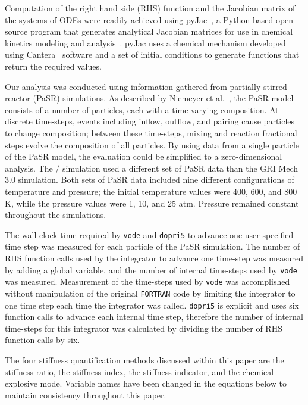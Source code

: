 \documentclass[12pt]{ussci}
\begin{document}
Computation of the right hand side (RHS) function and the Jacobian matrix of the systems of ODEs were readily achieved using pyJac~\cite{pyJac:1.0.2}, a Python-based open-source program that generates analytical Jacobian matrices for use in chemical kinetics modeling and analysis~\cite{Niemeyer:2017}.
pyJac uses a chemical mechanism developed using Cantera~\cite{Goodwin:2015aa} software and a set of initial conditions to generate functions that return the required values.

Our analysis was conducted using information gathered from partially stirred reactor (PaSR) simulations.
As described by Niemeyer et al.~\cite{Niemeyer:2017}, the PaSR model consists of a number of particles, each with a time-varying composition.
At discrete time-steps, events including inflow, outflow, and pairing cause particles to change composition; between these time-steps, mixing and reaction fractional steps evolve the composition of all particles.
By using data from a single particle of the PaSR model, the evaluation could be simplified to a zero-dimensional analysis.
The \slash {} simulation used a different set of PaSR data than the GRI Mech 3.0 simulation.
Both sets of PaSR data included nine different configurations of temperature and pressure; the initial temperature values were 400, 600, and 800 K, while the pressure values were 1, 10, and 25 atm.
Pressure remained constant throughout the simulations.

The wall clock time required by \texttt{vode} and \texttt{dopri5} to advance one user specified time step was measured for each particle of the PaSR simulation.
The number of RHS function calls used by the integrator to advance one time-step was measured by adding a global variable, and the number of internal time-steps used by \texttt{vode} was measured.
Measurement of the time-steps used by \texttt{vode} was accomplished without manipulation of the original \texttt{FORTRAN} code by limiting the integrator to one time step each time the integrator was called.
\texttt{dopri5} is explicit and uses six function calls to advance each internal time step, therefore the number of internal time-steps for this integrator was calculated by dividing the number of RHS function calls by six.


The four stiffness quantification methods discussed within this paper are the stiffness ratio, the stiffness index, the stiffness indicator, and the chemical explosive mode.
Variable names have been changed in the equations below to maintain consistency throughout this paper.
\end{document}
